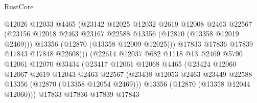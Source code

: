 \begin{lexlean}{RustCore}
\begin{coremodule}
                                    @12026
                                    @12033
                                    @4465
                                    (@23142
                                      @12025
                                      @12032
                                      @2619
                                      @12008
                                      @2463
                                      @22567
                                      (@23156
                                        @12018
                                        @2463
                                        @23167
                                        @22588
                                        @13356
                                        (@12870 (@13358 @12019 @2469)))
                                      @13356
                                      (@12870 (@13358 @12009 @12025)))
                                    @17833
                                    @17836
                                    @17839
                                    @17843
                                    @17848
                                    @22608)))
                              (@22614
                                @12037
                                @682
                                @1118
                                @13
                                @2469
                                @5790
                                @12061
                                @12070
                                @33434
                                (@23417
                                  @12061
                                  @12068
                                  @4465
                                  (@23424
                                    @12060
                                    @12067
                                    @2619
                                    @12043
                                    @2463
                                    @22567
                                    (@23438
                                      @12053
                                      @2463
                                      @23449
                                      @22588
                                      @13356
                                      (@12870 (@13358 @12054 @2469)))
                                    @13356
                                    (@12870 (@13358 @12044 @12060)))
                                  @17833
                                  @17836
                                  @17839
                                  @17843

\end{coremodule}
\end{lexlean}
